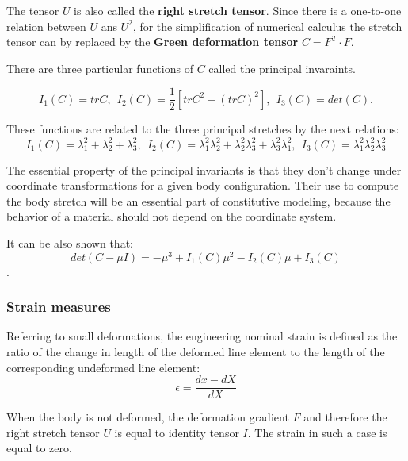 The tensor $U$ is also called the \textbf{right stretch tensor}.  Since there is a one-to-one relation between $U$ ans $U^2$, for the simplification of numerical calculus the stretch tensor can by replaced by the \textbf{Green deformation tensor} $C = F^T \cdot F$.



There are three particular functions of $C$ called the principal invaraints. 

\begin{equation}
\label{principal_invariants}
I_1(C) = tr C, \ \ I_2(C)=\frac{1}{2}\left[ trC^2 - \left(tr C \right)^2 \right], \ \ I_3(C)=det(C) .
\end{equation} 

These functions are related to the three principal stretches by the next relations:
\begin{equation}
\label{principalstrechinvariantsrelation}
I_1(C) = \lambda_1^2+\lambda_2^2+\lambda_3^2, \ \ I_2(C) = \lambda_1^2 \lambda_2^2 + \lambda_2^2 \lambda_3^2+ \lambda_3^2 \lambda_1^2, \ \ I_3(C) = \lambda_1^2 \lambda_2^2 \lambda_3^2
\end{equation}

The essential property of the principal invariants is that they don't change under coordinate transformations for a given body configuration. Their use to compute the body stretch will be an essential part of constitutive modeling, because the behavior of a material should not depend on the coordinate system.

It can be also shown that:
\begin{equation}
\label{eq:detinvariantrelation}
det(C-\mu I) = -\mu ^3+I_1(C)\mu ^2-I_2(C)\mu +I_3(C)
\end{equation} . 



\subsubsection*{Strain measures}\label{strainmeasure}
Referring to small deformations, the engineering nominal strain is defined as the ratio of the change in length of the deformed line element to the length of the corresponding undeformed line element:  
\begin{equation}
\epsilon = \frac{ dx  - dX }{	dX }
\end{equation}

When the body is not deformed, the deformation gradient $F$ and therefore the right stretch tensor $U$ is equal to identity tensor $I$. The strain in such a case is equal to zero. 


